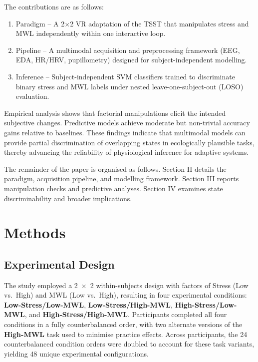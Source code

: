 \documentclass[lettersize,journal]{IEEEtran}
\begin{document}
The contributions are as follows:

\begin{enumerate}
\item Paradigm – A 2×2 VR adaptation of the TSST that manipulates stress and MWL independently within one interactive loop.

\item Pipeline – A multimodal acquisition and preprocessing framework (EEG, EDA, HR/HRV, pupillometry) designed for subject-independent modelling.

\item Inference – Subject-independent SVM classifiers trained to discriminate binary stress and MWL labels under nested leave-one-subject-out (LOSO) evaluation.

\end{enumerate}

Empirical analysis shows that factorial manipulations elicit the intended subjective changes. Predictive models achieve moderate but non-trivial accuracy gains relative to baselines. These findings indicate that multimodal models can provide partial discrimination of overlapping states in ecologically plausible tasks, thereby advancing the reliability of physiological inference for adaptive systems.

The remainder of the paper is organised as follows. Section II details the paradigm, acquisition pipeline, and modelling framework. Section III reports manipulation checks and predictive analyses. Section IV examines state discriminability and broader implications.


\section{Methods}


\subsection{Experimental Design}
The study employed a 2~\(\times\)~2 within-subjects design with factors of Stress (Low vs.\ High) and MWL (Low vs.\ High), resulting in four experimental conditions: \textbf{Low-Stress/Low-MWL}, \textbf{Low-Stress/High-MWL}, 
\textbf{High-Stress/Low-MWL}, and \textbf{High-Stress/High-MWL}.
 Participants completed all four conditions in a fully counterbalanced order, with two alternate versions of the \textbf{High-MWL} task used to minimise practice effects. Across participants, the 24 counterbalanced condition orders were doubled to account for these task variants, yielding 48 unique experimental configurations.
\end{document}
